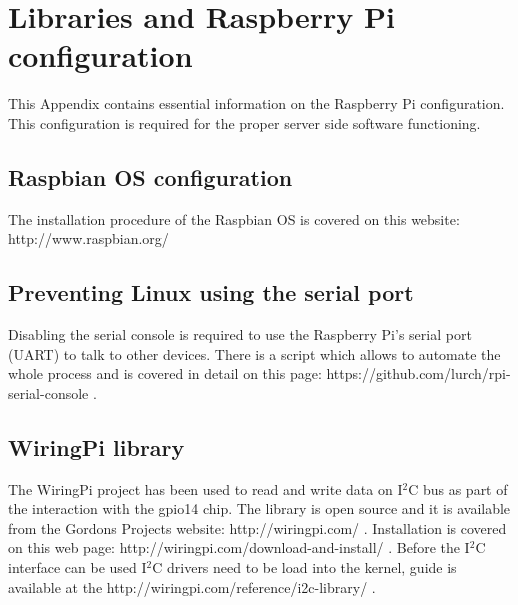\chapter{Libraries and Raspberry Pi configuration}
This Appendix contains essential information on the Raspberry Pi configuration. This configuration is required for the proper server side software functioning.

\section{Raspbian OS configuration}
The installation procedure of the Raspbian OS is covered on this website: http://www.raspbian.org/

\section{Preventing Linux using the serial port}
Disabling the serial console is required to use the Raspberry Pi's serial port (UART) to talk to other devices. There is a script which allows to automate the whole process and is covered in detail on this page: https://github.com/lurch/rpi-serial-console .

\section{WiringPi library}
The WiringPi project has been used to read and write data on I$^2$C bus as part of the interaction with the gpio14 chip. The library is open source and it is available from the Gordons Projects website: http://wiringpi.com/ . Installation is covered on this web page: http://wiringpi.com/download-and-install/ . Before the I$^2$C interface can be used I$^2$C drivers need to be load into the kernel, guide is available at the http://wiringpi.com/reference/i2c-library/ .  